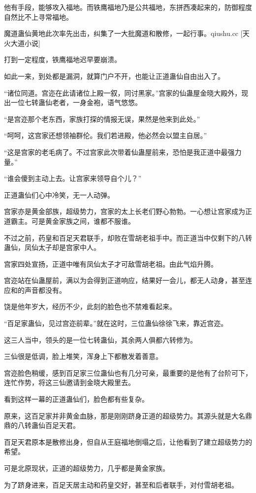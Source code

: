 \begin{this_body}
他有手段，能够攻入福地。而铁鹰福地乃是公共福地，东拼西凑起来的，防御程度自然比不上寻常福地。

魔道蛊仙黄地此次率先出击，纠集了一大批魔道和散修，一起行事。qiushu.cc [天火大道小说]

打到一定程度，铁鹰福地迟早要崩溃。

如此一来，到处都是漏洞，就算门户不开，也能让正道蛊仙自由出入了。

“诸位同道。宫迩在此请诸位上殿一叙，同讨黑家。”宫家的仙蛊屋金晓大殿外，现出一位七转蛊仙老者，一身金袍，语气悠悠。

“是宫迩那个老东西，家族打探的情报无误，果然是他来到此处。”

“呵呵，这宫家还想领袖群伦。我们若进殿，他必然会以盟主自居。”

“这是宫家的老毛病了。不过宫家此次带着仙蛊屋前来，恐怕是我正道中最强力量。”

“谁会傻到主动上去。让宫家来领导自个儿？”

正道蛊仙们心中冷笑，无一人动弹。

宫家亦是黄金部族，超级势力，宫家的太上长老们野心勃勃。一心想让宫家成为正道霸主。可是黄金家族之间，谁都不服谁。

不过之前，药皇和百足天君联手，却败在雪胡老祖手中。而正道当中仅剩下的八转蛊仙，凤仙太子却是宫家中人。

宫家四处宣扬，正道中唯有凤仙太子才可敌雪胡老祖。由此气焰升腾。

宫迩站在仙蛊屋前，满以为会得到正道响应，结果好一会儿，都无人动身，甚至连应和的声音都没有。

饶是他年岁大，经历不少，此刻的脸色也不禁难看起来。

“百足家蛊仙，见过宫迩前辈。”就在这时，三位蛊仙徐徐飞来，靠近宫迩。

这三人当中，领头的是一位七转蛊仙，其余两人俱都六转修为。

三仙很是低调，脸上堆笑，浑身上下都散发着善意。

宫迩脸色稍缓，感到百足家三位蛊仙也有几分可亲，最重要的是他有了台阶可下，连忙作势，将这三仙邀请到金晓大殿里去。

看到这样一幕的正道蛊仙们，脸色都有些复杂。

原来，这百足家并非黄金血脉，那是刚刚跻身正道的超级势力。其源头就是大名鼎鼎的八转蛊仙百足天君。

百足天君原本是散修出身，但自从王庭福地倒塌之后，让他看到了建立超级势力的希望。

可是北原现状，正道的超级势力，几乎都是黄金家族。

为了跻身进来，百足天居主动和药皇交好，甚至和后者联手，对付雪胡老祖。


\end{this_body}
